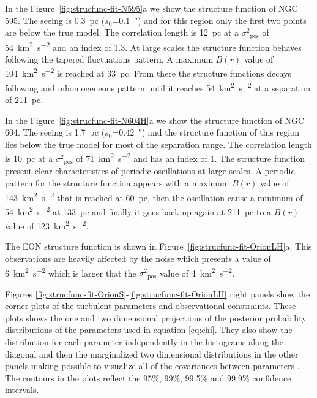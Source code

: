 \documentclass[fleqn,usenatbib, useAMS, a4paper]{mnras}
\newcommand\pos{\ensuremath{_{\mathrm{pos}}}}
\begin{document}
In the Figure~\ref{fig:strucfunc-fit-N595}a we show the structure function of NGC 595.
The seeing is \SI{0.3}{pc} (\(s_0\)=\SI{0.1}{\arcsecond}) and for this region only the first two points are below the true model. 
The correlation length is \SI{12}{pc} at a \(\sigma^2\pos\) of \SI{54}{km^{2}.s^{-2}} and an index of \num{1.3}.
At large scales the structure function behaves following the tapered fluctuations pattern.
A maximum \(B(r)\) value of \SI{104}{km^{2}.s^{-2}} is reached at \SI{33}{pc}. 
From there the structure functions decays following and inhomogeneous pattern until it reaches \SI{54}{km^{2}.s^{-2}} at a separation of \SI{211}{pc}.  

In the Figure~\ref{fig:strucfunc-fit-N604H}a we show the structure function of NGC 604.
The seeing is \SI{1.7}{pc} (\(s_0\)=\SI{0.42}{\arcsecond}) and the structure function of this region lies below the true model for most of the separation range.
The correlation length is \SI{10}{pc} at a \(\sigma^2\pos\) of \SI{71}{km^{2}.s^{-2}} and has an index of \num{1}.
The structure function present clear characteristics of periodic oscillations at large scales.
A periodic pattern for the structure function appears with a maximum \(B(r)\) value of \SI{143}{km^{2}.s^{-2}} that is reached at \SI{60}{pc}, then the oscillation cause a minimum of \SI{54}{km^{2}.s^{-2}} at \SI{133}{pc} and finally it goes back up again at \SI{211}{pc} to a \(B(r)\) value of \SI{123}{km^{2}.s^{-2}}.

The EON structure function is shown in Figure~\ref{fig:strucfunc-fit-OrionLH}a.
This observations are heavily affected by the noise which presents a value of \SI{6}{km^{2}.s^{-2}} which is larger that the \(\sigma^2\pos\) value of \SI{4}{km^{2}.s^{-2}}. 

Figures \ref{fig:strucfunc-fit-OrionS}-\ref{fig:strucfunc-fit-OrionLH} right panels show the corner plots \citep{2017ascl.soft02002F} of the turbulent parameters and observational constraints. 
These plots shows the one and two dimensional projections of the posterior probability distributions of the parameters used in equation \ref{eq:chi}.
They also show the distribution for each parameter independently in the histograms along the diagonal and then the marginalized two dimensional distributions in the other panels making possible to visualize all of the covariances between parameters \citep{2017ascl.soft02002F}.
The contours in the plots reflect the 95\(\%\), 99\(\%\), 99.5\(\%\) and 99.9\(\%\) confidence intervals.
\end{document}
